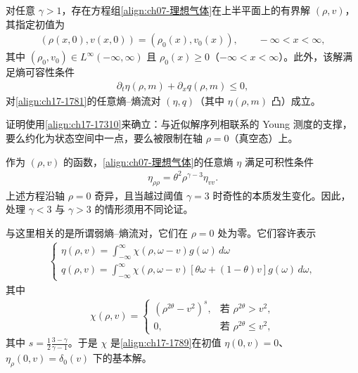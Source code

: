\documentclass[../../main.tex]{subfiles}
\begin{document}
\begin{theorem}[等熵气体动力学的存在性]\label{theorem:ch17-气体存在性}
对任意 $\gamma>1$，存在方程组\eqref{align:ch07-理想气体}在上半平面上的有界解 $(\rho,v)$，
其指定初值为
\begin{align}
(\rho(x,0),v(x,0))=(\rho_0(x),v_0(x)),\qquad-\infty<x<\infty,
\label{align:ch17-1787}
\end{align}
其中 $(\rho_0,v_0)\in L^\infty(-\infty,\infty)$ 且 $\rho_0(x)\geqslant0$（$-\infty<x<\infty$）。此外，该解满足熵可容性条件
\begin{align}
\partial_t\eta(\rho,m)+\partial_x q(\rho,m)\leqslant0,
\label{align:ch17-1788}
\end{align}
对\eqref{align:ch17-1781}的任意熵--熵流对 $(\eta,q)$（其中 $\eta(\rho,m)$ 凸）成立。
\end{theorem}

证明使用\eqref{align:ch17-17310}来确立：与近似解序列相联系的 Young 测度的支撑，要么约化为状态空间中一点，要么被限制在轴 $\rho=0$（真空态）上。

作为 $(\rho,v)$ 的函数，\eqref{align:ch07-理想气体}的任意熵 $\eta$ 满足可积性条件
\begin{align}
\eta_{\rho\rho}=\theta^2\rho^{\gamma-3}\eta_{vv}.
\label{align:ch17-1789}
\end{align}
上述方程沿轴 $\rho=0$ 奇异，且当越过阈值 $\gamma=3$ 时奇性的本质发生变化。因此，处理 $\gamma<3$ 与 $\gamma>3$ 的情形须用不同论证。

与这里相关的是所谓弱熵--熵流对，它们在 $\rho=0$ 处为零。它们容许表示
\begin{align}
\begin{cases}
\eta(\rho,v)=\displaystyle\int_{-\infty}^\infty\chi(\rho,\omega-v)g(\omega)\,d\omega\\
q(\rho,v)=\displaystyle\int_{-\infty}^\infty\chi(\rho,\omega-v)[\theta\omega+(1-\theta)v]g(\omega)\,d\omega,
\end{cases}
\label{align:ch17-17810}
\end{align}
其中
\begin{align}
\chi(\rho,v)=
\begin{cases}
(\rho^{2\theta}-v^2)^s,&\text{若 }\rho^{2\theta}>v^2,\\
0,&\text{若 }\rho^{2\theta}\leqslant v^2,
\end{cases}
\label{align:ch17-17811}
\end{align}
其中 $s=\frac{1}{2}\frac{3-\gamma}{\gamma-1}$。于是 $\chi$ 是\eqref{align:ch17-1789}在初值 $\eta(0,v)=0$、$\eta_\rho(0,v)=\delta_0(v)$ 下的基本解。
\end{document}
